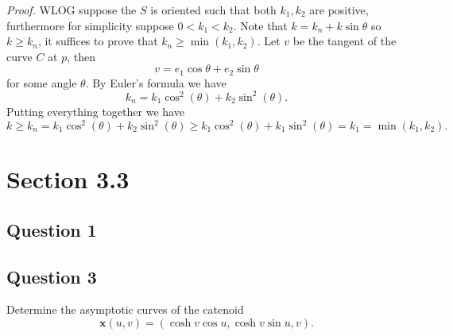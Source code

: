 \documentclass[12pt]{article}
\begin{document}
\emph{Proof.}
WLOG suppose the \(S\) is oriented such that both \(k_1, k_2\) are positive,
furthermore for simplicity suppose \(0 < k_1 < k_2\).
Note that \(k = k_n + k\sin\theta\) so \(k \geq k_n\),
it suffices to prove that \(k_n\geq \min(k_1,k_2)\).
Let \(v\) be the tangent of the curve \(C\) at \(p\), then
\[ v = e_1 \cos\theta + e_2 \sin\theta \]
for some angle \(\theta\).
By Euler's formula we have
\[ k_n = k_1 \cos^2(\theta) + k_2\sin^2(\theta). \]
Putting everything together we have
\[ k \geq k_n = k_1 \cos^2(\theta) + k_2\sin^2(\theta) \geq k_1 \cos^2(\theta) + k_1\sin^2(\theta) = k_1 = \min(k_1, k_2). \]

\section{Section 3.3}

\subsection*{Question 1}

\subsection*{Question 3}
Determine the asymptotic curves of the catenoid
\begin{equation*}
    \mathbf{x}(u,v)= (\cosh{v}\cos{u},\cosh{v}\sin{u},v).
\end{equation*}
\end{document}
